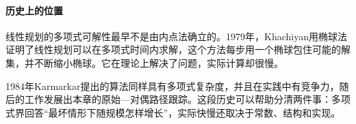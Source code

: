 \paragraph{历史上的位置}
线性规划的多项式可解性最早不是由内点法确立的。1979年，Khachiyan用椭球法证明了线性规划可以在多项式时间内求解，这个方法每步用一个椭球包住可能的解集，并不断缩小椭球。它在理论上解决了问题，实际计算却很慢。

1984年Karmarkar提出的算法同样具有多项式复杂度，并且在实践中有竞争力，随后的工作发展出本章的原始—对偶路径跟踪。这段历史可以帮助分清两件事：多项式界回答“最坏情形下随规模怎样增长”，实际快慢还取决于常数、结构和实现。
